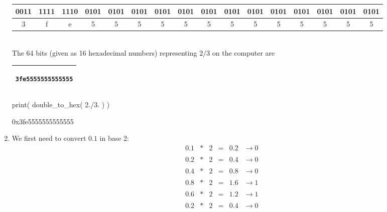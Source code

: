 \documentclass[pdftex,11pt]{article}
\begin{document}
\begin{enumerate}
\begin{tabular}{|c|c|c|c|c|c|c|c|c|c|c|c|c|c|c|c|}
\hline
0011&1111&1110&0101&0101&0101&0101&0101&0101&0101&0101&0101&0101&0101&0101&0101\\
\hline
3&f&e&5&5&5&5&5&5&5&5&5&5&5&5&5\\
\hline
\end{tabular}\\

The 64 bits (given as 16 hexadecimal numbers) representing $2/3$ on the computer are

\begin{center}
\begin{tabular}{|c|}
\hline
\begin{minipage}{0.17\textwidth}
\begin{verbatim}
3fe5555555555555
\end{verbatim}
\end{minipage}\\
\hline
\end{tabular}
\end{center}



\begin{python}
print( double_to_hex( 2./3. ) )
\end{python}
\begin{pythonoutput}
0x3fe5555555555555
\end{pythonoutput}




\begin{comment}


\underline{Matlab Check}:
\begin{verbatim}

>> format hex; 2/3, format

ans =

   3fe5555555555555

\end{verbatim}
\end{comment}

\item

We first need to convert $0.1$ in base 2:
$$
\begin{array}{rcrccc}
0.1& *& 2   & = & 0.2&    \rightarrow     0  \\\\
0.2& *& 2   & = & 0.4&    \rightarrow     0  \\\\
0.4& *& 2   & = & 0.8&    \rightarrow     0  \\\\
0.8& *& 2   & = & 1.6&    \rightarrow     1  \\\\
0.6& *& 2   & = & 1.2&    \rightarrow     1  \\\\
\hline
0.2& *& 2   & = & 0.4&    \rightarrow     0  \\\\
\end{array}
$$


\end{enumerate}
\end{document}
